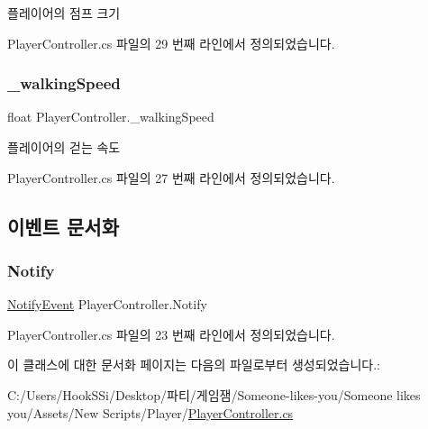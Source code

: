 플레이어의 점프 크기 



Player\+Controller.\+cs 파일의 29 번째 라인에서 정의되었습니다.

\mbox{\label{class_player_controller_a1ab6a7892eecf1a9fa7b1a49842a3dd2}} 
\subsubsection{\texorpdfstring{\_walkingSpeed}{\_walkingSpeed}}
{\footnotesize\ttfamily float Player\+Controller.\+\_\+walking\+Speed}



플레이어의 걷는 속도 



Player\+Controller.\+cs 파일의 27 번째 라인에서 정의되었습니다.



\subsection{이벤트 문서화}
\mbox{\label{class_player_controller_af13292e01756741118500035511fc88d}} 
\subsubsection{\texorpdfstring{Notify}{Notify}}
{\footnotesize\ttfamily \mbox{\hyperlink{class_player_controller_a934c7f80b80276620cd60eaaeea7520e}{Notify\+Event}} Player\+Controller.\+Notify\hspace{0.3cm}{\ttfamily [static]}}



Player\+Controller.\+cs 파일의 23 번째 라인에서 정의되었습니다.



이 클래스에 대한 문서화 페이지는 다음의 파일로부터 생성되었습니다.\+:\begin{DoxyCompactItemize}
\item 
C\+:/\+Users/\+Hook\+S\+Si/\+Desktop/파티/게임잼/\+Someone-\/likes-\/you/\+Someone likes you/\+Assets/\+New Scripts/\+Player/\mbox{\hyperlink{_player_controller_8cs}{Player\+Controller.\+cs}}\end{DoxyCompactItemize}
